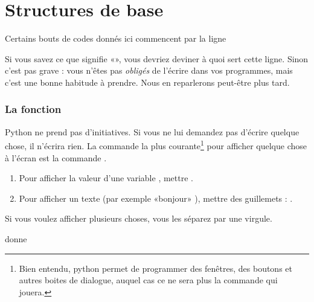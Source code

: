 
\chapter{Structures de base}

\begin{remark}
    Certains bouts de codes donnés ici commencent par la ligne
    \begin{quote}
    \end{quote}
    Si vous savez ce que signifie «», vous devriez deviner à quoi sert cette ligne. Sinon c'est pas grave : vous n'êtes pas \emph{obligés} de l'écrire dans vos programmes, mais c'est une bonne habitude à prendre. Nous en reparlerons peut-être plus tard.
\end{remark}

\subsection{La fonction }

Python ne prend pas d'initiatives. Si vous ne lui demandez pas d'écrire quelque chose, il n'écrira rien. La commande la plus courante\footnote{Bien entendu, python permet de programmer des fenêtres, des boutons et autres boites de dialogue, auquel cas ce ne sera plus la commande  qui jouera.} pour afficher quelque chose à l'écran est la commande . 
\begin{enumerate}
    \item
        Pour afficher la valeur d'une variable , mettre .
    \item
        Pour afficher un texte (par exemple «bonjour» ), mettre des guillemets : .
\end{enumerate}
Si vous voulez afficher plusieurs choses, vous les séparez par une virgule.



donne



